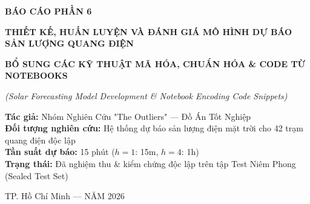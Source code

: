 \documentclass[12pt,a4paper]{article}
\begin{document}
\begin{titlepage}
    \centering
    \vspace*{1cm}
    
    {\Huge \bfseries BÁO CÁO PHẦN 6 \par}
    \vspace{0.5cm}
    {\huge \bfseries THIẾT KẾ, HUẤN LUYỆN VÀ ĐÁNH GIÁ MÔ HÌNH DỰ BÁO SẢN LƯỢNG QUANG ĐIỆN \par}
    \vspace{0.3cm}
    {\large \bfseries BỔ SUNG CÁC KỸ THUẬT MÃ HÓA, CHUẨN HÓA \& CODE TỪ NOTEBOOKS \par}
    \vspace{0.2cm}
    {\large \itshape (Solar Forecasting Model Development \& Notebook Encoding Code Snippets) \par}
    
    \vspace{1.5cm}
    \textbf{Tác giả:} Nhóm Nghiên Cứu "The Outliers" --- Đồ Án Tốt Nghiệp \\
    \textbf{Đối tượng nghiên cứu:} Hệ thống dự báo sản lượng điện mặt trời cho 42 trạm quang điện độc lập \\
    \textbf{Tần suất dự báo:} 15 phút ($h=1$: 15m, $h=4$: 1h) \\
    \textbf{Trạng thái:} Đã nghiệm thu \& kiểm chứng độc lập trên tập Test Niêm Phong (Sealed Test Set)
    
    \vfill
    {\large TP. Hồ Chí Minh --- NĂM 2026 \par}
\end{titlepage}
\end{document}
